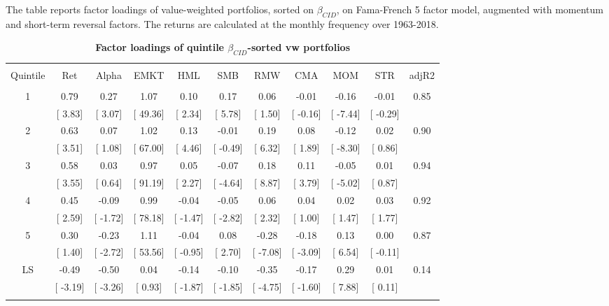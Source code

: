 \documentclass[12pt]{article}
\begin{document}
\begin{table}[!htbp] \centering 
  \caption{\textbf{Factor loadings of quintile $\beta_{CID}$-sorted vw portfolios}} 
  \label{} 
  \begin{flushleft}
    {\medskip\small
 The table reports factor loadings of value-weighted portfolios, sorted on $\beta_{CID}$, on Fama-French 5 factor model, augmented with momentum and short-term reversal factors. The returns are calculated at the monthly frequency over 1963-2018.}
    \medskip
    \end{flushleft}
\begin{tabular}{@{\extracolsep{0pt}} ccccccccccc} 
\\[-1.8ex]\hline 
\hline \\[-1.8ex] 
Quintile & Ret & Alpha & EMKT & HML & SMB & RMW & CMA & MOM & STR & adjR2 \\ 
\hline \\[-1.8ex] 
1 & 0.79 & 0.27 & 1.07 & 0.10 & 0.17 & 0.06 & -0.01 & -0.16 & -0.01 & 0.85 \\ 
 & [ 3.83] & [ 3.07] & [ 49.36] & [ 2.34] & [ 5.78] & [ 1.50] & [ -0.16] & [ -7.44] & [ -0.29] &  \\ 
2 & 0.63 & 0.07 & 1.02 & 0.13 & -0.01 & 0.19 & 0.08 & -0.12 & 0.02 & 0.90 \\ 
 & [ 3.51] & [ 1.08] & [ 67.00] & [ 4.46] & [ -0.49] & [ 6.32] & [ 1.89] & [ -8.30] & [ 0.86] &  \\ 
3 & 0.58 & 0.03 & 0.97 & 0.05 & -0.07 & 0.18 & 0.11 & -0.05 & 0.01 & 0.94 \\ 
 & [ 3.55] & [ 0.64] & [ 91.19] & [ 2.27] & [ -4.64] & [ 8.87] & [ 3.79] & [ -5.02] & [ 0.87] &  \\ 
4 & 0.45 & -0.09 & 0.99 & -0.04 & -0.05 & 0.06 & 0.04 & 0.02 & 0.03 & 0.92 \\ 
 & [ 2.59] & [ -1.72] & [ 78.18] & [ -1.47] & [ -2.82] & [ 2.32] & [ 1.00] & [ 1.47] & [ 1.77] &  \\ 
5 & 0.30 & -0.23 & 1.11 & -0.04 & 0.08 & -0.28 & -0.18 & 0.13 & 0.00 & 0.87 \\ 
 & [ 1.40] & [ -2.72] & [ 53.56] & [ -0.95] & [ 2.70] & [ -7.08] & [ -3.09] & [ 6.54] & [ -0.11] &  \\ 
LS & -0.49 & -0.50 & 0.04 & -0.14 & -0.10 & -0.35 & -0.17 & 0.29 & 0.01 & 0.14 \\ 
 & [ -3.19] & [ -3.26] & [ 0.93] & [ -1.87] & [ -1.85] & [ -4.75] & [ -1.60] & [ 7.88] & [ 0.11] &  \\ 
\hline \\[-1.8ex] 
\end{tabular} 
\end{table} 
\end{document}
